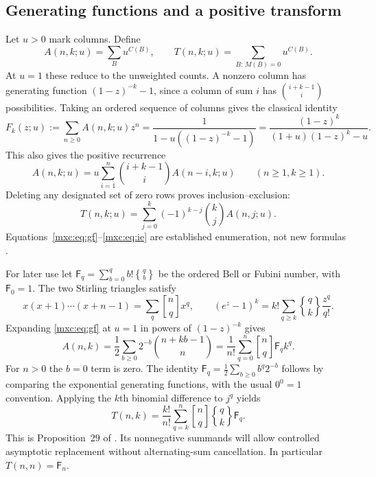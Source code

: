 \documentclass[11pt]{article}
\numberwithin{equation}{section}
\theoremstyle{definition}
\theoremstyle{remark}
\newcommand{\StirOne}[2]{\genfrac{[}{]}{0pt}{}{#1}{#2}}
\newcommand{\StirTwo}[2]{\genfrac{\{} {\}}{0pt}{}{#1}{#2}}
\begin{document}
\subsection{Generating functions and a positive transform}
Let $u>0$ mark columns. Define
\[
 A(n,k;u)=\sum_B u^{C(B)},\qquad
 T(n,k;u)=\sum_{B:\,M(B)=0}u^{C(B)}.
\]
At $u=1$ these reduce to the unweighted counts. A nonzero column has
generating function $(1-z)^{-k}-1$, since a column of sum $i$ has
$\binom{i+k-1}{i}$ possibilities. Taking an ordered sequence of columns
gives the classical identity
\begin{equation}\label{mxc:eq:gf}
 F_k(z;u):=\sum_{n\ge0}A(n,k;u)z^n
 =\frac{1}{1-u((1-z)^{-k}-1)}
 =\frac{(1-z)^k}{(1+u)(1-z)^k-u}.
\end{equation}
This also gives the positive recurrence
\begin{equation}\label{mxc:eq:positive-rec}
 A(n,k;u)=u\sum_{i=1}^n\binom{i+k-1}{i}A(n-i,k;u)
 \qquad(n\ge1,k\ge1).
\end{equation}
Deleting any designated set of zero rows proves inclusion--exclusion:
\begin{equation}\label{mxc:eq:ie}
 T(n,k;u)=\sum_{j=0}^k(-1)^{k-j}\binom{k}{j}A(n,j;u).
\end{equation}
Equations~\eqref{mxc:eq:gf}--\eqref{mxc:eq:ie} are established enumeration,
not new formulas \cite{mpr2009,oeis780,oeis781}.

For later use let $\mathsf F_q=\sum_{b=0}^q b!\StirTwo{q}{b}$ be the
ordered Bell or Fubini number, with $\mathsf F_0=1$. The two Stirling
triangles satisfy
\[
 x(x+1)\cdots(x+n-1)=\sum_q\StirOne{n}{q}x^q,
 \qquad
 (e^z-1)^k=k!\sum_{q\ge k}\StirTwo{q}{k}\frac{z^q}{q!}.
\]
Expanding \eqref{mxc:eq:gf} at $u=1$ in powers of $(1-z)^{-k}$ gives
\[
 A(n,k)=\frac12\sum_{b\ge0}2^{-b}\binom{n+kb-1}{n}
 =\frac1{n!}\sum_{q=0}^n\StirOne{n}{q}\mathsf F_q k^q.
\]
For $n>0$ the $b=0$ term is zero. The identity
$\mathsf F_q=\frac12\sum_{b\ge0}b^q2^{-b}$ follows by comparing the
exponential generating functions, with the usual $0^0=1$ convention.
Applying the $k$th binomial difference to $j^q$ yields
\begin{equation}\label{mxc:eq:stirling}
 \boxed{\displaystyle
 T(n,k)=\frac{k!}{n!}\sum_{q=k}^n
    \StirOne{n}{q}\StirTwo{q}{k}\mathsf F_q.}
\end{equation}
This is Proposition~29 of \cite{mpr2009}. Its nonnegative summands
will allow controlled asymptotic replacement without alternating-sum
cancellation. In particular $T(n,n)=\mathsf F_n$.
\end{document}
